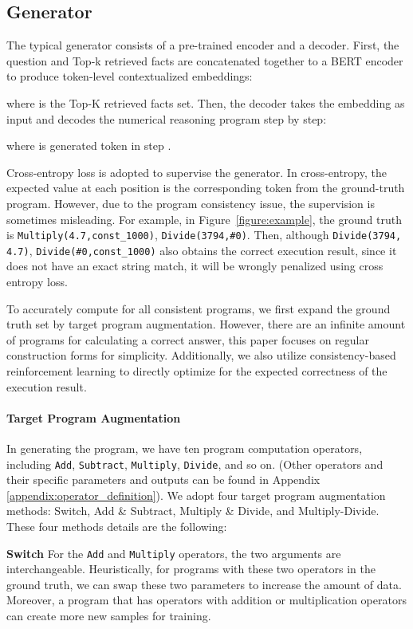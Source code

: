 \documentclass[11pt]{article}
\begin{document}
\subsection{Generator}
\label{sec:generator}

The typical generator consists of a pre-trained encoder and a decoder. First, the question and Top-k retrieved facts are concatenated together to a BERT encoder to produce token-level contextualized embeddings:

where  is the Top-K retrieved facts set. Then, the decoder takes the embedding  as input and decodes the numerical reasoning program step by step:

where  is generated token in step . 

Cross-entropy loss is adopted to supervise the generator. In cross-entropy, the expected value at each position is the corresponding token from the ground-truth program. However, due to the program consistency issue, the supervision is sometimes misleading. For example, in Figure~\ref{figure:example}, the ground truth is \texttt{Multiply(4.7,const\_1000)}, \texttt{Divide(3794,\#0)}. Then, although \texttt{Divide(3794, 4.7)}, \texttt{Divide(\#0,const\_1000)} also obtains the correct execution result, since it does not have an exact string match, it will be wrongly penalized using cross entropy loss.

To accurately compute  for all consistent programs, we first expand the ground truth set by target program augmentation. However, there are an infinite amount of programs for calculating a correct answer, this paper focuses on regular construction forms for simplicity. Additionally, we also utilize consistency-based reinforcement learning to directly optimize for the expected correctness of the execution result. 

\paragraph{Target Program Augmentation}
\label{sec:TPA}
In generating the program, we have ten program computation operators, including \texttt{Add}, \texttt{Subtract}, \texttt{Multiply}, \texttt{Divide}, and so on. (Other operators and their specific parameters and outputs can be found in Appendix \ref{appendix:operator_definition}). We adopt four target program augmentation methods: Switch, Add \& Subtract, Multiply \& Divide, and Multiply-Divide. These four methods details are the following:

\textbf{Switch} For the  \texttt{Add} and \texttt{Multiply} operators, the two arguments are interchangeable. Heuristically, for programs with these two operators in the ground truth, we can swap these two parameters to increase the amount of data. Moreover, a program that has  operators with addition or multiplication operators can create  more new samples for training.
\end{document}
